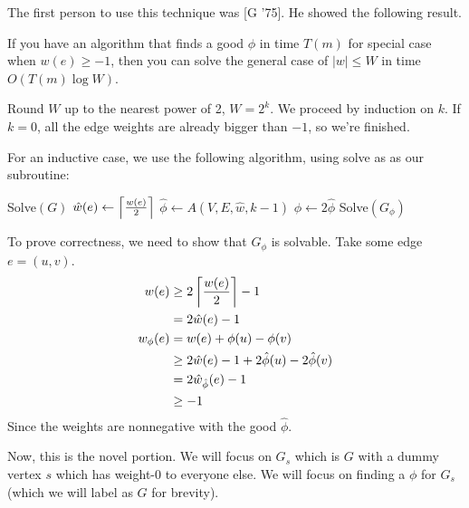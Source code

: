 The first person to use this technique was [G '75]. He showed the following result.

\begin{theorem} If you have an algorithm that finds a good $\phi$ in time $T(m)$ for special case
when $w(e) \geq -1$, then you can solve the general case of $|w| \leq W$ in time $O(T(m) \log W)$.

\begin{proof*}
    Round $W$ up to the nearest power of 2, $W = 2^k$. We proceed by induction on $k$. If $k = 0$, all the edge weights are already bigger than $-1$, so we're finished.

    For an inductive case, we use the following algorithm, using solve as as our subroutine:
    \begin{algorithmic}
             \State \Return Solve$(G)$
            \Else
            \State $\hat{w}(e) \gets \left\lceil \frac{w(e)}{2} \right\rceil$
            \State $\hat{\phi} \gets A(V, E, \hat{w}, k - 1)$
            \State $\phi \gets 2 \hat{\phi}$
            \State \Return Solve$(G_{\phi})$
            \EndIf
        \EndFunction
    \end{algorithmic}

    To prove correctness, we need to show that $G_{\phi}$ is solvable. Take some edge $e = (u, v)$.
    \begin{align*}
        w(e) &\geq 2 \left\lceil \frac{w(e)}{2} \right\rceil - 1 \\
        &= 2 \hat{w}(e) - 1 \\
        w_{\phi}(e) &= w(e) + \phi(u) - \phi(v) \\
        &\geq 2 \hat{w}(e) - 1 + 2 \hat{\phi}(u) - 2 \hat{\phi}(v) \\
        &= 2 \hat{w}_{\hat{\phi}}(e) - 1 \\
        &\geq -1
    \end{align*}
    Since the weights are nonnegative with the good $\hat{\phi}$.
\end{proof*}
\end{theorem}

Now, this is the novel portion.
We will focus on $G_s$ which is $G$ with a dummy vertex $s$ which has weight-0 to everyone else. We will focus on finding a $\phi$ for $G_s$ (which we will label as $G$ for brevity).


